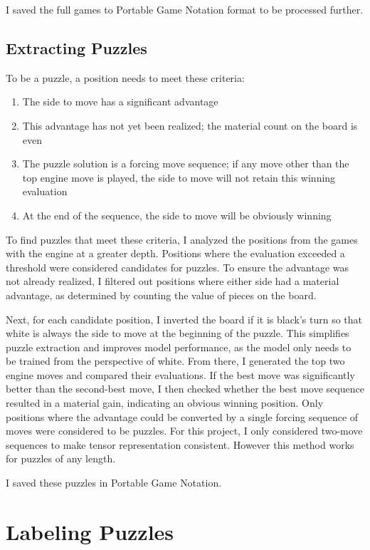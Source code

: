 \documentclass{article}
\begin{document}
I saved the full games to Portable Game Notation format to be processed further.

\subsection{Extracting Puzzles}

To be a puzzle, a position needs to meet these criteria:

\begin{enumerate}
      \item The side to move has a significant advantage
      \item This advantage has not yet been realized; the material count on the board is even
      \item The puzzle solution is a forcing move sequence; if any move other than the top engine move is played, the side to move will not retain this winning evaluation
      \item At the end of the sequence, the side to move will be obviously winning
\end{enumerate}

To find puzzles that meet these criteria, I analyzed the positions from the games with the engine at a greater depth. Positions where the evaluation exceeded a threshold were considered candidates for puzzles. To ensure the advantage was not already realized, I filtered out positions where either side had a material advantage, as determined by counting the value of pieces on the board.

Next, for each candidate position, I inverted the board if it is black's turn so that white is always the side to move at the beginning of the puzzle. This simplifies puzzle extraction and improves model performance, as the model only needs to be trained from the perspective of white. From there, I generated the top two engine moves and compared their evaluations. If the best move was significantly better than the second-best move, I then checked whether the best move sequence resulted in a material gain, indicating an obvious winning position. Only positions where the advantage could be converted by a single forcing sequence of moves were considered to be puzzles. For this project, I only considered two-move sequences to make tensor representation consistent. However this method works for puzzles of any length.

I saved these puzzles in Portable Game Notation.

\section{Labeling Puzzles}
\end{document}
